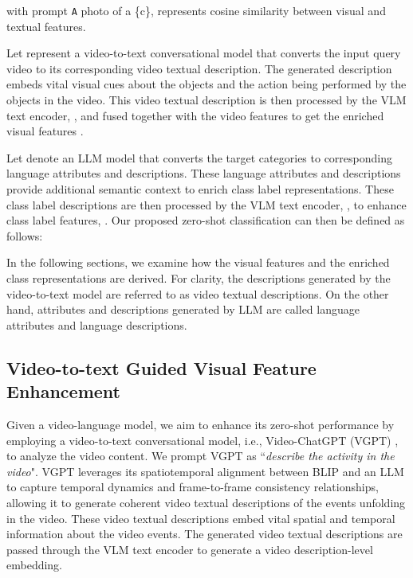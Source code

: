 \documentclass{article} \usepackage{iclr2024_conference,times}
\begin{document}
with prompt  \texttt A photo of a \{c\},   represents cosine similarity between visual and textual features.

Let   represent a video-to-text conversational model that converts the input query video  to its corresponding video textual description. The generated description embeds vital visual cues about the objects and the action being performed by the objects in the video. This video textual description is then processed by the VLM text encoder, , and fused together with the video features to get the enriched visual features .


Let   denote an LLM model that converts the target categories  to corresponding language attributes and descriptions. These language attributes and descriptions provide additional semantic context to enrich class label representations. These class label descriptions are then processed by the VLM text encoder, , to enhance class label features, . Our proposed zero-shot classification can then be defined as follows:

In the following sections, we examine how the visual features  and the enriched class representations  are derived. For clarity, the descriptions generated by the video-to-text model \citep{maaz2023video} are referred to as video textual descriptions. On the other hand, attributes and descriptions generated by LLM \citep{brown2020language} are called language attributes and language descriptions.

\subsection{Video-to-text Guided Visual Feature Enhancement}
\label{subsec:Video-to-text Guided Visual Feature Enhancement}
Given a video-language model, we aim to enhance its zero-shot performance by employing a video-to-text conversational model, i.e., Video-ChatGPT (VGPT) \citep{maaz2023video}, to analyze the video content. We prompt VGPT as ``\emph{describe the activity in the video}". VGPT leverages its spatiotemporal alignment between BLIP \citep{li2022blip} and an LLM \citep{chiang2023vicuna} to capture temporal dynamics and frame-to-frame consistency relationships, allowing it to generate coherent video textual descriptions of the events unfolding in the video. These video textual descriptions embed vital spatial and temporal information about the video events. The generated video textual descriptions are passed through the VLM text encoder  to generate a video description-level embedding.
\end{document}
